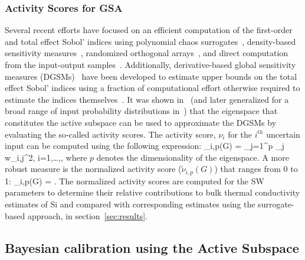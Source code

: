 \subsubsection{Activity Scores for GSA}
\label{subsub:gsa_as}
Several recent efforts have
focused on an efficient computation of the first-order and total effect Sobol' indices
using polynomial chaos surrogates~\cite{Sudret:2008}, density-based sensitivity measures~\cite{Plischke:2013},
 randomized orthogonal arrays~\cite{Tissot:2015}, and direct computation from the input-output 
 samples~\cite{Li:2016}. Additionally,
derivative-based global sensitivity measures (DGSMs)~\cite{Sobol:2009, Lamboni:2013}
have been developed to estimate upper bounds on the total effect Sobol' indices using a fraction of computational effort
otherwise required to estimate the indices themselves~\cite{Vohra:2018b}. It was shown 
in~\cite{Diaz:2016,Constantine:2017} (and later generalized for a broad range of input probability distributions 
in~\cite{Vohra:2018c}) that the eigenspace that constitutes the active subspace can be used to
approximate the DGSMs by evaluating the so-called activity scores. The activity score, $\nu_i$ for the 
$i^{th}$ uncertain input can be computed using the following expression:
%
\be
\nu_{i,p}(G) = \sum\limits_{j=1}^{p} \lambda_j w_{i,j}^2, i=1,\ldots,\Nt,
\label{eq:ac}
\ee
%
where $p$ denotes the dimensionality of the eigenspace. 
A more robust measure is the normalized activity score ($\tilde{\nu}_{i,p}(G)$) that ranges from 0 to 1:
%
\be
\tilde{\nu}_{i,p}(G) = .
\label{eq:nac}
\ee
%
The normalized activity scores are computed for the SW parameters to determine their relative contributions
to bulk thermal conductivity estimates of Si and compared with corresponding estimates using the surrogate-based
approach, in section~\ref{sec:results}. 

\subsection{Bayesian calibration using the Active Subspace}
\label{sub:ba_method}

